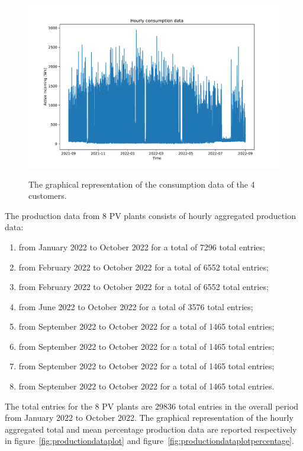 \begin{figure}[H]
\begin{minipage}[b]{8.5cm}
\label{fig:dataplotcustomer3}
\end{minipage}
\ \hspace{2mm} \
\begin{minipage}[b]{8.5cm}
\centering
\includegraphics[width=1\textwidth]{images/baseline/data_plot_customer4}
\subcaption{Fourth customer.}
\label{fig:dataplotcustomer4}
\end{minipage}
\caption{The graphical representation of the consumption data of the 4 customers.}
\end{figure}

The production data from 8 PV plants consists of hourly aggregated production data:
\begin{enumerate}
  \item from January 2022 to October 2022 for a total of 7296 total entries;
  \item from February 2022 to October 2022 for a total of 6552 total entries;
  \item from February 2022 to October 2022 for a total of 6552 total entries;
  \item from June 2022 to October 2022 for a total of 3576 total entries;
  \item from September 2022 to October 2022 for a total of 1465 total entries;
  \item from September 2022 to October 2022 for a total of 1465 total entries;
  \item from September 2022 to October 2022 for a total of 1465 total entries;
  \item from September 2022 to October 2022 for a total of 1465 total entries.
\end{enumerate}
The total entries for the 8 PV plants are 29836 total entries in the overall period from January 2022 to October 2022.
The graphical representation of the hourly aggregated total and mean percentage production data are reported respectively in figure~\ref{fig:productiondataplot} and figure~\ref{fig:productiondataplotpercentage}.

